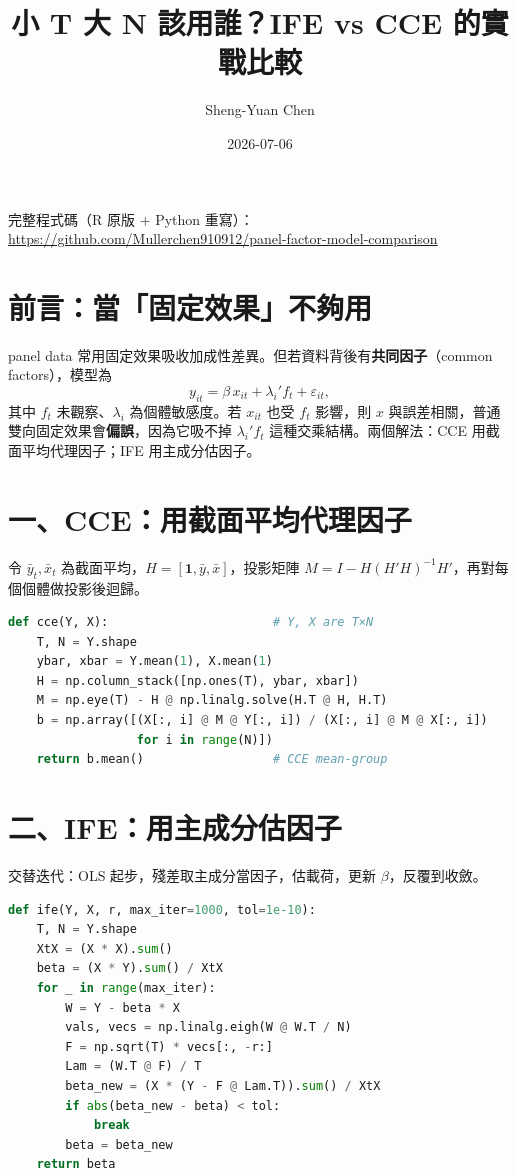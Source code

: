 \documentclass[12pt, a4paper]{article}
\title{小 T 大 N 該用誰？IFE vs CCE 的實戰比較}
\author{Sheng-Yuan Chen}
\date{2026-07-06}
\begin{document}
\maketitle

\begin{center}
完整程式碼（R 原版 + Python 重寫）：\url{https://github.com/Mullerchen910912/panel-factor-model-comparison}
\end{center}

\section{前言：當「固定效果」不夠用}

panel data 常用固定效果吸收加成性差異。但若資料背後有\textbf{共同因子}（common factors），模型為
$$y_{it} = \beta\, x_{it} + \lambda_i' f_t + \varepsilon_{it},$$
其中 $f_t$ 未觀察、$\lambda_i$ 為個體敏感度。若 $x_{it}$ 也受 $f_t$ 影響，則 $x$ 與誤差相關，普通雙向固定效果會\textbf{偏誤}，因為它吸不掉 $\lambda_i' f_t$ 這種交乘結構。兩個解法：CCE \citep{pesaran2006} 用截面平均代理因子；IFE \citep{bai2009} 用主成分估因子。

\section{一、CCE：用截面平均代理因子}

令 $\bar y_t, \bar x_t$ 為截面平均，$H = [\mathbf{1}, \bar y, \bar x]$，投影矩陣 $M = I - H(H'H)^{-1}H'$，再對每個個體做投影後迴歸。

\begin{lstlisting}[language=Python]
def cce(Y, X):                       # Y, X are T×N
    T, N = Y.shape
    ybar, xbar = Y.mean(1), X.mean(1)
    H = np.column_stack([np.ones(T), ybar, xbar])
    M = np.eye(T) - H @ np.linalg.solve(H.T @ H, H.T)
    b = np.array([(X[:, i] @ M @ Y[:, i]) / (X[:, i] @ M @ X[:, i])
                  for i in range(N)])
    return b.mean()                  # CCE mean-group
\end{lstlisting}

\section{二、IFE：用主成分估因子}

交替迭代：OLS 起步，殘差取主成分當因子，估載荷，更新 $\beta$，反覆到收斂。

\begin{lstlisting}[language=Python]
def ife(Y, X, r, max_iter=1000, tol=1e-10):
    T, N = Y.shape
    XtX = (X * X).sum()
    beta = (X * Y).sum() / XtX
    for _ in range(max_iter):
        W = Y - beta * X
        vals, vecs = np.linalg.eigh(W @ W.T / N)
        F = np.sqrt(T) * vecs[:, -r:]
        Lam = (W.T @ F) / T
        beta_new = (X * (Y - F @ Lam.T)).sum() / XtX
        if abs(beta_new - beta) < tol:
            break
        beta = beta_new
    return beta
\end{lstlisting}
\end{document}
